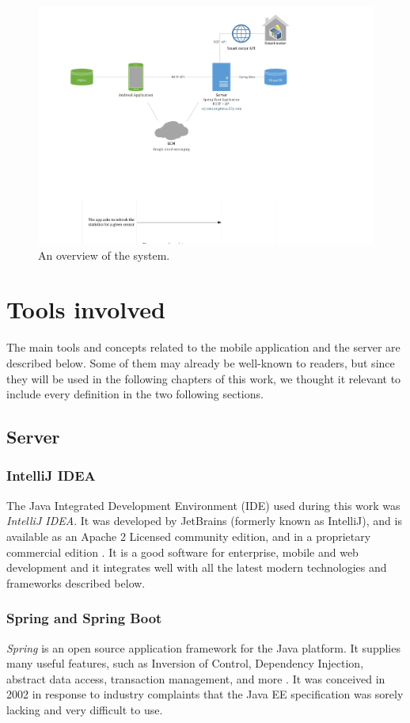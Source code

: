 \documentclass[a4paper, oneside, 11pt]{book}
\begin{document}
\begin{figure}[htbp]
	\centerline{\includegraphics[width=1\textwidth]{global.pdf}}
	\caption{An overview of the system.}
	\label{fig:global}
\end{figure}

\section{Tools involved}
The main tools and concepts related to the mobile application and the server are described below. Some of them may already be well-known to readers, but since they will be used in the following chapters of this work, we thought it relevant to include every definition in the two following sections.

\subsection{Server}
\subsubsection{IntelliJ IDEA}
The Java Integrated Development Environment (IDE) used during this work was \textit{IntelliJ IDEA}. It was developed by JetBrains (formerly known as IntelliJ), and is available as an Apache 2 Licensed community edition, and in a proprietary commercial edition \cite{intellij:online}. It is a good software for enterprise, mobile and web development and it integrates well with all the latest modern technologies and frameworks described below.

\subsubsection{Spring and Spring Boot}
\textit{Spring} is an open source application framework for the Java platform. It supplies many useful features, such as Inversion of Control, Dependency Injection, abstract data access, transaction management, and more \cite{professional:book}. It was conceived in 2002 in response to industry complaints that the Java EE specification was sorely lacking and very difficult to use.\\
\end{document}
